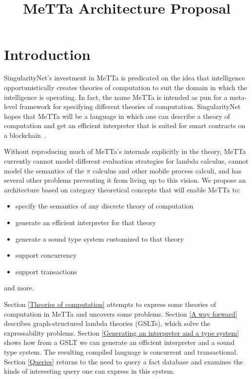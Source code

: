 \documentclass{article}
\title{MeTTa Architecture Proposal}
\author{}
\date{}
\begin{document}
\maketitle

\tableofcontents

\section{Introduction}

SingularityNet's investment in MeTTa is predicated on the idea that intelligence opportunistically creates theories of computation to suit the domain in which the intelligence is operating.  In fact, the name MeTTa is intended as pun for a meta-level framework for specifying different theories of computation.  SingularityNet hopes that MeTTa will be a language in which one can describe a theory of computation and get an efficient interpreter that is suited for smart contracts on a blockchain~\cite{GoertzelMeredith2024}.

Without reproducing much of MeTTa's internals explicitly in the theory, MeTTa currently cannot model different evaluation strategies for lambda calculus, cannot model the semantics of the $\pi$ calculus and other mobile process calculi, and has several other problems preventing it from living up to this vision.  We propose an architecture based on category theoretical concepts that will enable MeTTa to:
\begin{itemize}
    \item specify the semantics of any discrete theory of computation
    \item generate an efficient interpreter for that theory
    \item generate a sound type system customized to that theory
    \item support concurrency
    \item support transactions
\end{itemize}
and more.

Section \ref{Theories of computation} attempts to express some theories of computation in MeTTa and uncovers some problems.  Section \ref{A way forward} describes graph-structured lambda theories (GSLTs), which solve the expressability problems.  Section \ref{Generating an interpreter and a type system} shows how from a GSLT we can generate an efficient interpreter and a sound type system.  The resulting compiled language is concurrent and transactional. Section \ref{Queries} returns to the need to query a fact database and examines the kinds of interesting query one can express in this system.
\end{document}
